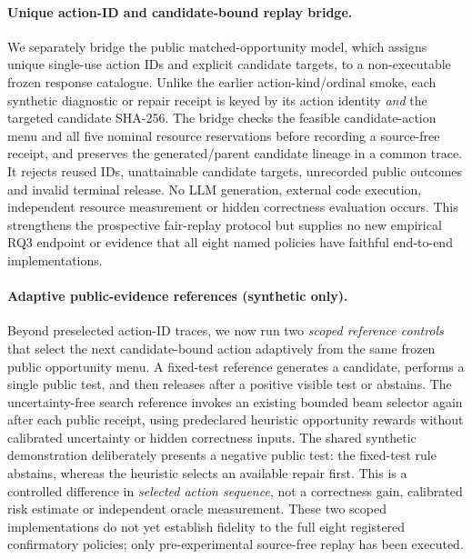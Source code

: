\documentclass[pdflatex,sn-basic]{sn-jnl}
\begin{document}
\paragraph{Unique action-ID and candidate-bound replay bridge.}
We separately bridge the public matched-opportunity model,
which assigns unique single-use action IDs and explicit
candidate targets, to a non-executable frozen response
catalogue. Unlike the earlier action-kind/ordinal smoke,
each synthetic diagnostic or repair receipt is keyed by
its action identity \emph{and} the targeted candidate
SHA-256. The bridge checks the feasible candidate-action
menu and all five nominal resource reservations before
recording a source-free receipt, and preserves the
generated/parent candidate lineage in a common trace.
It rejects reused IDs, unattainable candidate targets,
unrecorded public outcomes and invalid terminal release.
No LLM generation, external code execution, independent
resource measurement or hidden correctness evaluation
occurs. This strengthens the prospective fair-replay
protocol but supplies no new empirical RQ3 endpoint
or evidence that all eight named policies have faithful
end-to-end implementations.

\paragraph{Adaptive public-evidence references (synthetic only).}
Beyond preselected action-ID traces, we now run two
\emph{scoped reference controls} that select the next
candidate-bound action adaptively from the same frozen
public opportunity menu. A fixed-test reference generates
a candidate, performs a single public test, and then
releases after a positive visible test or abstains. The
uncertainty-free search reference invokes an existing
bounded beam selector again after each public receipt,
using predeclared heuristic opportunity rewards without
calibrated uncertainty or hidden correctness inputs.
The shared synthetic demonstration deliberately presents
a negative public test: the fixed-test rule abstains,
whereas the heuristic selects an available repair first.
This is a controlled difference in \emph{selected action
sequence}, not a correctness gain, calibrated risk
estimate or independent oracle measurement. These two
scoped implementations do not yet establish fidelity to
the full eight registered confirmatory policies; only
pre-experimental source-free replay has been executed.
\end{document}
